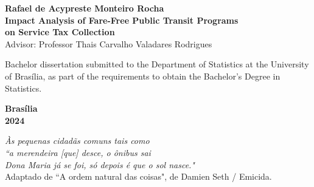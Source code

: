\documentclass[12pt, a4paper, twoside]{article}
\numberwithin{equation}{subsection} %
\newcommand{\titulo}{Impact Analysis of Fare-Free Public Transit
Programs \\ on Service Tax Collection}
\newcommand{\autor}{Rafael de Acypreste Monteiro Rocha}
\newcommand{\orientador}{ Professor Thais Carvalho Valadares Rodrigues }
\newcommand{\coorientador}{ Prof(a).  }
\begin{document}

\thispagestyle{empty}

\begin{center}
\textbf{\autor} \\
\vspace{5cm}
\textbf{\titulo} \\
\vspace{3cm}
\small
Advisor: \orientador \\
\end{center}


\vspace*{3cm}

\begin{flushright}
\begin{minipage}{7.5cm}
 \parbox[t]{7.5cm}{Bachelor dissertation submitted to the Department of
Statistics at the University of Brasília, as part of the requirements to
obtain the Bachelor's Degree in Statistics.}
\end{minipage}
\end{flushright}

\vspace{5cm}

\begin{center}
{\bf{Brasília} \\ }
\bf{2024}
\end{center}




\newpage %
\thispagestyle{empty} %


\begin{flushright} %
\textit{Às pequenas cidadãs comuns tais como \\
        ``a merendeira [que] desce, o ônibus sai \\
        Dona Maria já se foi, só depois é que o sol nasce."}\\
\vspace{1cm}        
Adaptado de ``A ordem natural das coisas", de Damien Seth / Emicida.
\end{flushright}


\setcounter{page}{3} 
\end{document}
